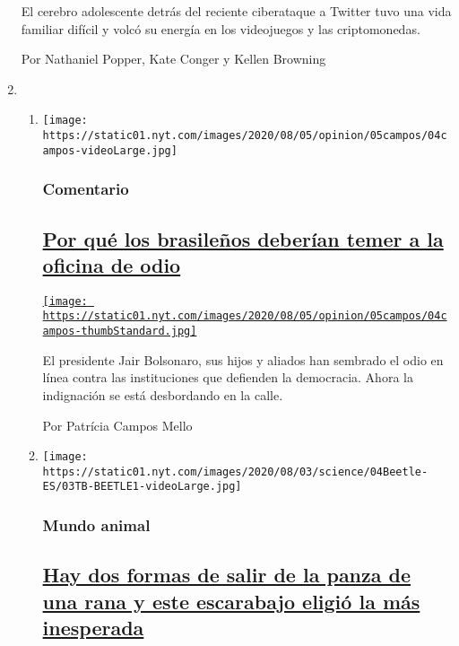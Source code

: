 \begin{enumerate}
  El cerebro adolescente detrás del reciente ciberataque a Twitter tuvo
  una vida familiar difícil y volcó su energía en los videojuegos y las
  criptomonedas.

  Por Nathaniel Popper, Kate Conger y Kellen Browning
\item
  \begin{enumerate}
  \def\labelenumii{\arabic{enumii}.}
  \item
    \texttt{[image: https://static01.nyt.com/images/2020/08/05/opinion/05campos/04campos-videoLarge.jpg]}

    \hypertarget{comentario}{%
    \subsubsection{Comentario}\label{comentario}}

    \hypertarget{por-quuxe9-los-brasileuxf1os-deberuxedan-temer-a-la-oficina-de-odio}{%
    \subsection{\texorpdfstring{\href{/es/2020/08/04/espanol/opinion/bolsonaro-oficina-odio-brasil.html}{Por
    qué los brasileños deberían temer a la oficina de
    odio}}{Por qué los brasileños deberían temer a la oficina de odio}}\label{por-quuxe9-los-brasileuxf1os-deberuxedan-temer-a-la-oficina-de-odio}}

    \href{/es/2020/08/04/espanol/opinion/bolsonaro-oficina-odio-brasil.html}{\texttt{[image: https://static01.nyt.com/images/2020/08/05/opinion/05campos/04campos-thumbStandard.jpg]}}

    El presidente Jair Bolsonaro, sus hijos y aliados han sembrado el
    odio en línea contra las instituciones que defienden la democracia.
    Ahora la indignación se está desbordando en la calle.

    Por Patrícia Campos Mello
  \item
    \texttt{[image: https://static01.nyt.com/images/2020/08/03/science/04Beetle-ES/03TB-BEETLE1-videoLarge.jpg]}

    \hypertarget{mundo-animal}{%
    \subsubsection{Mundo animal}\label{mundo-animal}}

    \hypertarget{hay-dos-formas-de-salir-de-la-panza-de-una-rana-y-este-escarabajo-eligiuxf3-la-muxe1s-inesperada}{%
    \subsection{\texorpdfstring{\href{/es/2020/08/04/espanol/ciencia-y-tecnologia/escarabajo-excremento-rana.html}{Hay
    dos formas de salir de la panza de una rana y este escarabajo eligió
    la más
    inesperada}}{Hay dos formas de salir de la panza de una rana y este escarabajo eligió la más inesperada}}\label{hay-dos-formas-de-salir-de-la-panza-de-una-rana-y-este-escarabajo-eligiuxf3-la-muxe1s-inesperada}}


\end{enumerate}
\end{enumerate}
